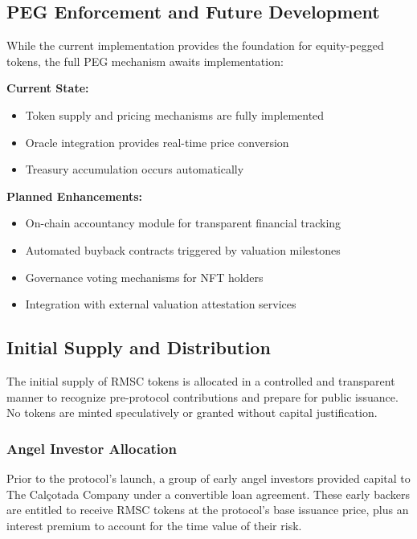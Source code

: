 \documentclass[conference]{IEEEtran}
\begin{document}
\subsection{PEG Enforcement and Future Development}

While the current implementation provides the foundation for equity-pegged tokens, the full PEG mechanism awaits implementation:

\textbf{Current State:}
\begin{itemize}
    \item Token supply and pricing mechanisms are fully implemented
    \item Oracle integration provides real-time price conversion
    \item Treasury accumulation occurs automatically
\end{itemize}

\textbf{Planned Enhancements:}
\begin{itemize}
    \item On-chain accountancy module for transparent financial tracking
    \item Automated buyback contracts triggered by valuation milestones
    \item Governance voting mechanisms for NFT holders
    \item Integration with external valuation attestation services
\end{itemize}

\subsection{Initial Supply and Distribution}

The initial supply of RMSC tokens is allocated in a controlled and transparent manner to recognize pre-protocol contributions and prepare for public issuance. No tokens are minted speculatively or granted without capital justification.

\subsubsection{Angel Investor Allocation}

Prior to the protocol's launch, a group of early angel investors provided capital to The Calçotada Company under a convertible loan agreement. These early backers are entitled to receive RMSC tokens at the protocol’s base issuance price, plus an interest premium to account for the time value of their risk.
\end{document}

